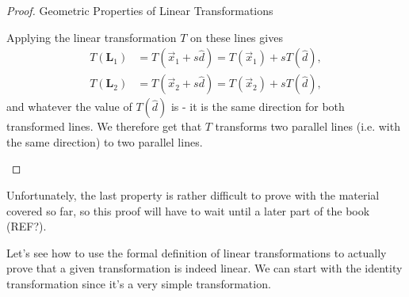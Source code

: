 \begin{proof}{Geometric Properties of Linear Transformations}{}
\begin{descitemize}
		Applying the linear transformation $T$ on these lines gives
		\begin{align*}
			T\left(\mathbf{L}_{1}\right) & = T\left(\vec{x}_{1}+s\hat{d}\right) = T\left(\vec{x}_{1}\right) + sT\left(\hat{d}\right), \\
			T\left(\mathbf{L}_{2}\right) & = T\left(\vec{x}_{2}+s\hat{d}\right) = T\left(\vec{x}_{2}\right) + sT\left(\hat{d}\right),
		\end{align*}
		and whatever the value of $T(\hat{d})$ is - it is the same direction for both transformed lines. We therefore get that $T$ transforms two parallel lines (i.e. with the same direction) to two parallel lines.
	\end{descitemize}
\end{proof}

Unfortunately, the last property is rather difficult to prove with the material covered so far, so this proof will have to wait until a later part of the book (REF?).

Let's see how to use the formal definition of linear transformations to actually prove that a given transformation is indeed linear. We can start with the identity transformation since it's a very simple transformation.

